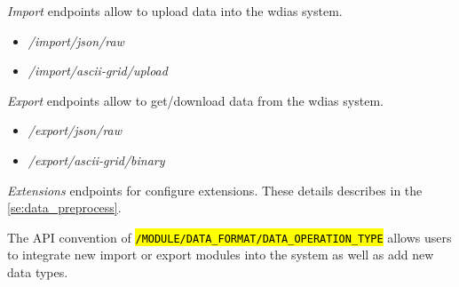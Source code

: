 \emph{Import} endpoints allow to upload data into the \acrshort{wdias} system.
\begin{itemize}
    \item \emph{/import/json/raw}
    \item \emph{/import/ascii-grid/upload}
\end{itemize}

\emph{Export} endpoints allow to get/download data from the \acrshort{wdias} system.
\begin{itemize}
    \item \emph{/export/json/raw}
    \item \emph{/export/ascii-grid/binary}
\end{itemize}

\emph{Extensions} endpoints for configure extensions. These details describes in the \cref{se:data_preprocess}.

The API convention of \texttt{\hl{/MODULE/DATA\_FORMAT/DATA\_OPERATION\_TYPE}}  allows users to integrate new import or export modules into the system as well as add new data types.

